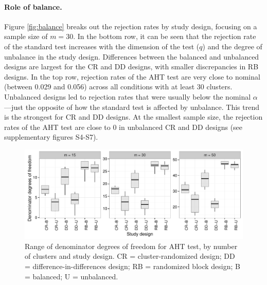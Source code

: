 \documentclass[12pt]{article}\usepackage[]{graphicx}\usepackage[]{color}
\newenvironment{knitrout}{}{} %
\begin{document}
\paragraph{Role of balance.} Figure \ref{fig:balance} breaks out the rejection rates by study design, focusing on a sample size of $m = 30$. 
In the bottom row, it can be seen that the rejection rate of the standard test increases with the dimension of the test ($q$) and the degree of unbalance in the study design.
Differences between the balanced and unbalanced designs are largest for the CR and DD designs, with smaller discrepancies in RB designs.
In the top row, rejection rates of the AHT test are very close to nominal (between 0.029 and 0.056) across all conditions with at least 30 clusters.
Unbalanced designs led to rejection rates that were usually below the nominal $\alpha$---just the opposite of how the standard test is affected by unbalance. 
This trend is the strongest for CR and DD designs. 
At the smallest sample size, the rejection rates of the AHT test are close to 0 in unbalanced CR and DD designs (see supplementary figures S4-S7). 

\begin{knitrout}
\color{fgcolor}\begin{figure}

{\centering \includegraphics[width=\linewidth]{CR_fig/df-1} 

}

\caption[Range of denominator degrees of freedom for AHT test, by number of clusters and study design]{Range of denominator degrees of freedom for AHT test, by number of clusters and study design. CR = cluster-randomized design; DD = difference-in-differences design; RB = randomized block design; B = balanced; U = unbalanced.}\label{fig:df}
\end{figure}


\end{knitrout}
\end{document}
